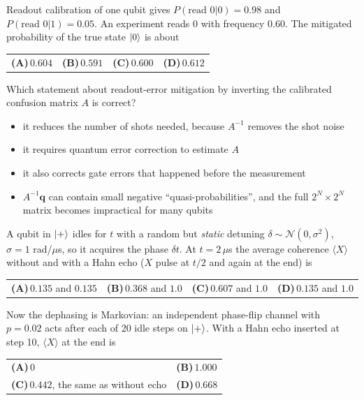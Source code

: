 \documentclass[11pt,a4paper]{article}
\newcommand{\optlabel}[1]{\textbf{(#1)}}
\newenvironment{qitem}[1]{\begin{list}{}{\setlength{\leftmargin}{3.3em}\setlength{\labelwidth}{3.1em}%
  \setlength{\labelsep}{0.2em}\setlength{\topsep}{3pt}\setlength{\parsep}{3pt}}\item[\textbf{Q.#1}\hfill]}{\end{list}}
\newcommand{\qsep}{\par\vspace{2pt}{\color{black!15}\hrule}\vspace{4pt}}
\begin{document}
\begin{qitem}{66}
Readout calibration of one qubit gives $P(\text{read }0|0) = 0.98$ and $P(\text{read }0|1) = 0.05$. An experiment reads $0$ with frequency $0.60$. The mitigated
probability of the true state $\ket0$ is about
\par\smallskip\noindent\begin{tabularx}{\linewidth}{@{}*{4}{L}@{}}
\optlabel{A}\,$0.604$ & \optlabel{B}\,$0.591$ & \optlabel{C}\,$0.600$ & \optlabel{D}\,$0.612$
\end{tabularx}
\end{qitem}
\qsep

\begin{qitem}{67}
Which statement about readout-error mitigation by inverting the calibrated confusion matrix $A$ is correct?
\begin{itemize}[leftmargin=2.6em, labelsep=0.4em, itemsep=2pt, topsep=3pt]
\item[\optlabel{A}] it reduces the number of shots needed, because $A^{-1}$ removes the shot noise
\item[\optlabel{B}] it requires quantum error correction to estimate $A$
\item[\optlabel{C}] it also corrects gate errors that happened before the measurement
\item[\optlabel{D}] $A^{-1}\mathbf q$ can contain small negative ``quasi-probabilities'', and the full $2^N\times2^N$ matrix becomes impractical for many qubits
\end{itemize}
\end{qitem}
\qsep

\begin{qitem}{68}
A qubit in $\ket+$ idles for $t$ with a random but \emph{static} detuning $\delta \sim \mathcal N(0, \sigma^2)$, $\sigma = 1$ rad/$\mu$s, so it acquires the phase $\delta t$. At
$t = 2\,\mu$s the average coherence $\langle X\rangle$ without and with a Hahn echo ($X$ pulse at $t/2$ and again at the end) is
\par\smallskip\noindent\begin{tabularx}{\linewidth}{@{}*{4}{L}@{}}
\optlabel{A}\,$0.135$ and $0.135$ & \optlabel{B}\,$0.368$ and $1.0$ & \optlabel{C}\,$0.607$ and $1.0$ & \optlabel{D}\,$0.135$ and $1.0$
\end{tabularx}
\end{qitem}
\qsep

\begin{qitem}{69}
Now the dephasing is Markovian: an independent phase-flip channel with $p = 0.02$ acts after each of 20 idle steps on $\ket+$. With a Hahn echo inserted at step 10,
$\langle X\rangle$ at the end is
\par\smallskip\noindent\begin{tabularx}{\linewidth}{@{}*{2}{L}@{}}
\optlabel{A}\,$0$ & \optlabel{B}\,$1.000$ \\[3pt]
\optlabel{C}\,$0.442$, the same as without echo & \optlabel{D}\,$0.668$
\end{tabularx}
\end{qitem}
\qsep
\end{document}
